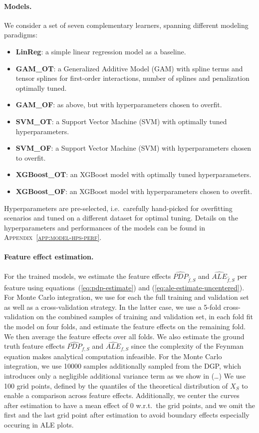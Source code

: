 \documentclass[runningheads]{llncs}
\begin{document}
\paragraph{Models.}
We consider a set of seven complementary learners, spanning different modeling
paradigms:

\begin{itemize}[label=--]
    \item \textbf{LinReg}: a simple linear regression model as a baseline.
    \item \textbf{GAM\_OT}: a Generalized Additive Model (GAM) with spline terms
          and tensor splines for first-order interactions, number of splines
          and penalization optimally tuned.
    \item \textbf{GAM\_OF}: as above, but with hyperparameters chosen to overfit.
    \item \textbf{SVM\_OT}: a Support Vector Machine (SVM) with optimally tuned hyperparameters.
    \item \textbf{SVM\_OF}: a Support Vector Machine (SVM) with hyperparameters chosen to overfit.
    \item \textbf{XGBoost\_OT}: an XGBoost model with optimally tuned hyperparameters.
    \item \textbf{XGBoost\_OF}: an XGBoost model with hyperparameters chosen to overfit.
\end{itemize}

\noindent Hyperparameters are pre-selected, i.e.\ carefully hand-picked for overfitting scenarios
and tuned on a different dataset for optimal tuning. Details on the hyperparameters and performances
of the models can be found in \textsc{Appendix~\ref{app:model-hps-perf}}.

\paragraph{Feature effect estimation.}
For the trained models, we estimate the feature effects
$\widehat{PDP}_{\hat{f},S}$ and $\widehat{ALE}_{\hat f,S}$ per feature using
equations~(\ref{eq:pdp-estimate}) and (\ref{eq:ale-estimate-uncentered}). For
Monte Carlo integration, we use for each the full training and validation set
as well as a cross-validation strategy. In the latter case, we use a 5-fold
cross-validation on the combined samples of training and validation set, in
each fold fit the model on four folds, and estimate the feature effects on the
remaining fold. We then average the feature effects over all folds. We also
estimate the ground truth feature effects $\widehat{PDP}_{f,S}$ and
$\widehat{ALE}_{f,S}$ since the complexity of the Feynman equation makes
analytical computation infeasible. For the Monte Carlo integration, we use
10000 samples additionally sampled from the DGP, which introduces only a
negligible additional variance term as we show in (\dots) We use 100 grid
points, defined by the quantiles of the theoretical distribution of $X_S$ to
enable a comparison across feature effects. Additionally, we center the curves
after estimation to have a mean effect of $0$ w.r.t.\ the grid points, and we
omit the first and the last grid point after estimation to avoid boundary
effects especially occuring in ALE plots.
\end{document}
